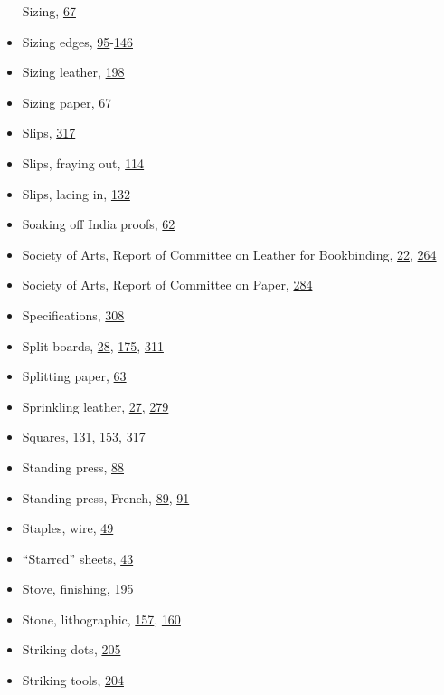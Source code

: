 \documentclass[
]{article}
\begin{document}
\begin{itemize}
  Sizing, \protect\hyperlink{Page_67}{67}
\item
  Sizing edges,
  \protect\hyperlink{Page_95}{95}-\protect\hyperlink{Page_146}{146}
\item
  Sizing leather, \protect\hyperlink{Page_198}{198}
\item
  Sizing paper, \protect\hyperlink{Page_67}{67}
\item
  Slips, \protect\hyperlink{Page_317}{317}
\item
  Slips, fraying out, \protect\hyperlink{Page_114}{114}
\item
  Slips, lacing in, \protect\hyperlink{Page_132}{132}
\item
  Soaking off India proofs, \protect\hyperlink{Page_62}{62}
\item
  Society of Arts, Report of Committee on Leather for Bookbinding,
  \protect\hyperlink{Page_22}{22}, \protect\hyperlink{Page_264}{264}
\item
  Society of Arts, Report of Committee on Paper,
  \protect\hyperlink{Page_284}{284}
\item
  Specifications, \protect\hyperlink{Page_308}{308}
\item
  Split boards, \protect\hyperlink{Page_28}{28},
  \protect\hyperlink{Page_175}{175}, \protect\hyperlink{Page_311}{311}
\item
  Splitting paper, \protect\hyperlink{Page_63}{63}
\item
  Sprinkling leather, \protect\hyperlink{Page_27}{27},
  \protect\hyperlink{Page_279}{279}
\item
  Squares, \protect\hyperlink{Page_131}{131},
  \protect\hyperlink{Page_153}{153}, \protect\hyperlink{Page_317}{317}
\item
  Standing press, \protect\hyperlink{Page_88}{88}
\item
  Standing press, French, \protect\hyperlink{Page_89}{89},
  \protect\hyperlink{Page_91}{91}
\item
  Staples, wire, \protect\hyperlink{Page_49}{49}
\item
  ``Starred'' sheets, \protect\hyperlink{Page_43}{43}
\item
  Stove, finishing, \protect\hyperlink{Page_195}{195}
\item
  Stone, lithographic, \protect\hyperlink{Page_157}{157},
  \protect\hyperlink{Page_160}{160}
\item
  Striking dots, \protect\hyperlink{Page_205}{205}
\item
  Striking tools, \protect\hyperlink{Page_204}{204}

\end{itemize}
\end{document}
